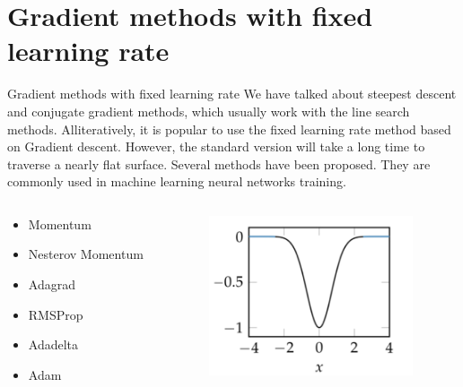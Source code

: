 \documentclass{beamer}
\begin{document}
\section{Gradient methods with fixed learning rate}
\begin{frame}{Gradient methods with fixed learning rate}
We have talked about steepest descent and conjugate gradient methods, which usually work with the line search methods. Alliteratively, it is popular to use the fixed learning rate method based on Gradient descent. However, the standard version will take a long time to traverse a nearly flat surface.
Several methods have been proposed. They are commonly used in machine learning neural networks training.
\begin{columns}
\begin{column}{.4\textwidth}
\begin{itemize}
    \item Momentum
    \item Nesterov Momentum
    \item Adagrad
    \item RMSProp
    \item Adadelta
    \item Adam
\end{itemize}
\end{column}

\begin{column}{.6\textwidth}
\begin{figure}
\centering
\includegraphics[width=60mm]{Lecture_notes/Figs/flat.jpeg}
\end{figure}
\end{column}
\end{columns}
\end{frame}
\end{document}
